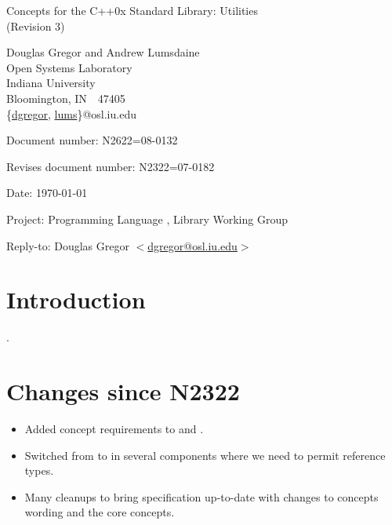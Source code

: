 \documentclass[american,twoside]{book}
\begin{document}
\raggedbottom

\begin{titlepage}
\begin{center}
\huge
Concepts for the C++0x Standard Library: Utilities\\
(Revision 3)

\vspace{0.5in}

\normalsize
Douglas Gregor and Andrew Lumsdaine \\
Open Systems Laboratory \\
Indiana University \\
Bloomington, IN\ \  47405 \\
\{\href{mailto:dgregor@osl.iu.edu}{dgregor}, \href{mailto:lums@osl.iu.edu}{lums}\}@osl.iu.edu
\end{center}

\vspace{1in}
\par\noindent Document number: N2622=08-0132\vspace{-6pt}
\par\noindent Revises document number: N2322=07-0182\vspace{-6pt}
\par\noindent Date: \today\vspace{-6pt}
\par\noindent Project: Programming Language \Cpp{}, Library Working Group\vspace{-6pt}
\par\noindent Reply-to: Douglas Gregor $<$\href{mailto:dgregor@osl.iu.edu}{dgregor@osl.iu.edu}$>$\vspace{-6pt}

\section*{Introduction}
.

\section*{Changes since N2322}
\begin{itemize}
\item Added concept requirements to  and
  .
\item Switched from  to  in
  several components where we need to permit reference types.
\item Many cleanups to bring specification up-to-date with changes to
  concepts wording and the core concepts.
\end{itemize}

\end{titlepage}
\end{document}
